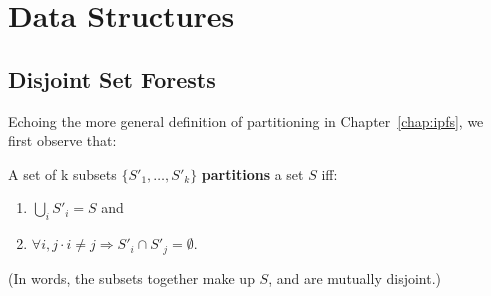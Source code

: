 \chapter{Data Structures}
\label{chap:appendixds}

\section{Disjoint Set Forests}

Echoing the more general definition of partitioning in Chapter~\ref{chap:ipfs}, we first observe that:

\begin{definition}
A set of k subsets $\{S'_1,\ldots,S'_k\}$ \textbf{partitions} a set $S$ iff:

\begin{enumerate}
\item $\bigcup_i S'_i = S$ and
\item $\forall i,j \cdot i \ne j \Rightarrow S'_i \cap S'_j = \emptyset$.
\end{enumerate}

\noindent (In words, the subsets together make up $S$, and are mutually disjoint.)
\end{definition}

